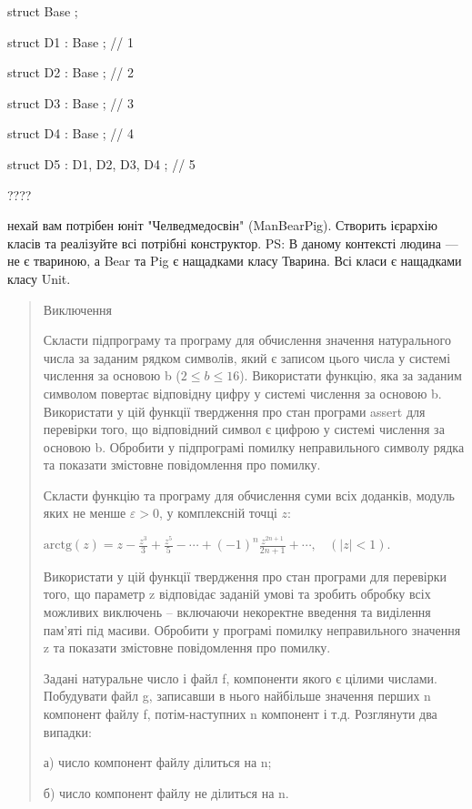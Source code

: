 \documentclass[]{article}
\begin{document}
struct Base {};

struct D1 : Base {}; // 1

struct D2 : Base {}; // 2

struct D3 : Base {}; // 3

struct D4 : Base {}; // 4

struct D5 : D1, D2, D3, D4 {}; // 5

????


нехай вам потрібен юніт "Челведмедосвін" (ManBearPig).
Створить ієрархію класів та реалізуйте всі потрібні конструктор.
PS: В даному контексті людина — не є твариною, а Bear та Pig є нащадками класу Тварина.
Всі класи є нащадками класу Unit.



\begin{quote}
Виключення

\protect\hypertarget{_Hlk65951733}{}{}Скласти підпрограму та програму
для обчислення значення натурального числа за заданим рядком символів,
який є записом цього числа у системі числення за основою b
(\(2 \leq b \leq 16\)). Використати функцію, яка за заданим символом
повертає відповідну цифру у системі числення за основою b. Використати у
цій функції твердження про стан програми assert для перевірки того, що
відповідний символ є цифрою у системі числення за основою b. Обробити у
підпрограмі помилку неправильного символу рядка та показати змістовне
повідомлення про помилку.

Скласти функцію та програму для обчислення суми всіх доданків, модуль
яких не менше $\varepsilon >0$, у комплексній точці $z$:

\(\text{arctg}\left( z \right) = z - \frac{z^{3}}{3} + \frac{z^{5}}{5} - \cdots + {( - 1)}^{n}\frac{z^{2n + 1}}{2n + 1} + \cdots,\ \ \ \ (\left| z \right| < 1)\).

Використати у цій функції твердження про стан програми для перевірки
того, що параметр z відповідає заданій умові та зробить обробку всіх
можливих виключень -- включаючи некоректне введення та виділення пам'яті
під масиви. Обробити у програмі помилку неправильного значення z та
показати змістовне повідомлення про помилку.

Задані натуральне число і файл f, компоненти якого є цілими числами.
Побудувати файл g, записавши в нього найбільше значення перших n
компонент файлу f, потім-наступних n компонент і т.д. Розглянути два
випадки:

а) число компонент файлу ділиться на n;

б) число компонент файлу не ділиться на n.


\end{quote}
\end{document}
